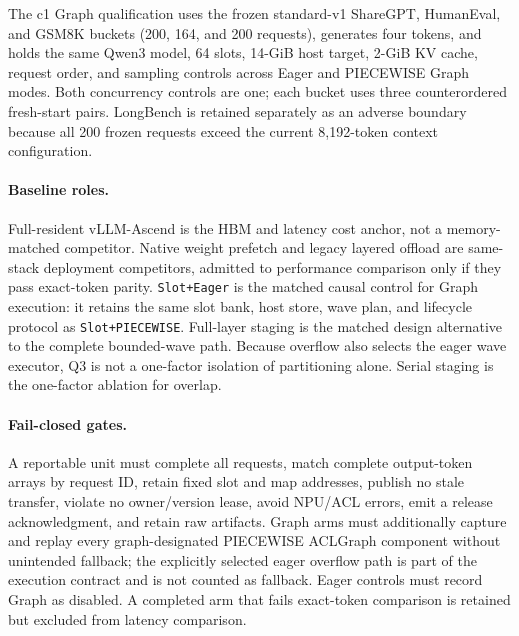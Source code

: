 The c1 Graph qualification uses the frozen standard-v1 ShareGPT, HumanEval,
and GSM8K buckets (200, 164, and 200 requests), generates
four tokens, and holds the same Qwen3 model, 64 slots, 14-GiB host target,
2-GiB KV cache, request order, and sampling controls across Eager and PIECEWISE
Graph modes. Both concurrency controls are one; each bucket uses three
counterordered fresh-start pairs. LongBench is retained separately as an
adverse boundary because all 200 frozen requests exceed the current
8,192-token context configuration.

\paragraph{Baseline roles.}
Full-resident vLLM-Ascend is the HBM and latency cost anchor, not a
memory-matched competitor. Native weight prefetch and legacy layered offload
are same-stack deployment competitors, admitted to performance comparison only
if they pass exact-token parity. \texttt{Slot+Eager} is the matched causal
control for Graph execution: it retains the same slot bank, host store, wave
plan, and lifecycle protocol as \texttt{Slot+PIECEWISE}. Full-layer staging
is the matched design alternative to the complete bounded-wave path. Because
overflow also selects the eager wave executor, Q3 is not a one-factor isolation
of partitioning alone. Serial staging is the one-factor ablation for overlap.

\paragraph{Fail-closed gates.}
A reportable unit must complete all requests, match complete output-token
arrays by request ID, retain fixed slot and map addresses, publish no stale
transfer, violate no owner/version lease, avoid NPU/ACL errors, emit a release
acknowledgment, and retain raw artifacts. Graph arms must additionally capture
and replay every graph-designated PIECEWISE ACLGraph component without
unintended fallback; the explicitly selected eager overflow path is part of the
execution contract and is not counted as fallback. Eager controls must record
Graph as disabled. A completed arm that fails exact-token comparison is
retained but excluded from latency comparison.

